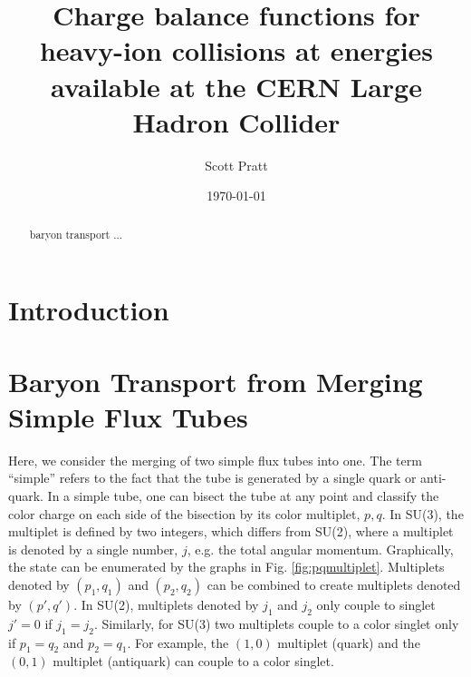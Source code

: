 \documentclass[aps, prc, 12pt, nofootinbib, showpacs, superscriptaddress, tightenlines, groupedaddress]{revtex4-2}
\begin{document}
\title{Charge balance functions for heavy-ion collisions at energies
   available at the CERN Large Hadron Collider}
\author{Scott Pratt}
\date{\today}

\pacs{}

\begin{abstract}
baryon transport ...
\end{abstract}

\maketitle

\section{Introduction}

\section{Baryon Transport from Merging Simple Flux Tubes}

Here, we consider the merging of two simple flux tubes into one. The term ``simple'' refers to the fact that the tube is generated by a single quark or anti-quark. In a simple tube, one can bisect the tube at any point and classify the color charge on each side of the bisection by its color multiplet, $p,q$. In SU(3), the multiplet is defined by two integers, which differs from SU(2), where a multiplet is denoted by a single number, $j$, e.g. the total angular momentum. Graphically, the state can be enumerated by the graphs in Fig. \ref{fig:pqmultiplet}. Multiplets denoted by $(p_1,q_1)$ and $(p_2,q_2)$ can be combined to create multiplets denoted by $(p',q')$. In SU(2), multiplets denoted by $j_1$ and $j_2$ only couple to singlet $j'=0$ if $j_1=j_2$. Similarly, for SU(3) two multiplets couple to a color singlet only if $p_1=q_2$ and $p_2=q_1$. For example, the $(1,0)$ multiplet (quark) and the $(0,1)$ multiplet (antiquark) can couple to a color singlet.
\end{document}
